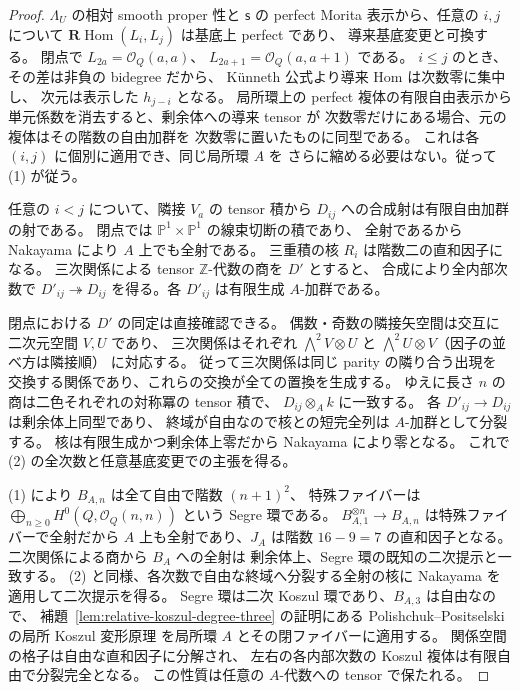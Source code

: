 \begin{proof}
$\Lambda_U$ の相対 smooth proper 性と $\mathsf s$ の perfect
Morita 表示から、任意の $i,j$ について
$\mathbf R\operatorname{Hom}(L_i,L_j)$ は基底上 perfect であり、
導来基底変更と可換する。
閉点で $L_{2a}=\mathcal O_Q(a,a)$、
$L_{2a+1}=\mathcal O_Q(a,a+1)$ である。
$i\le j$ のとき、その差は非負の bidegree だから、
K\"unneth 公式より導来 Hom は次数零に集中し、
次元は表示した $h_{j-i}$ となる。
局所環上の perfect 複体の有限自由表示から
単元係数を消去すると、剰余体への導来 tensor が
次数零だけにある場合、元の複体はその階数の自由加群を
次数零に置いたものに同型である。
これは各 $(i,j)$ に個別に適用でき、同じ局所環 $A$ を
さらに縮める必要はない。従って (1) が従う。

任意の $i<j$ について、隣接 $V_a$ の tensor 積から
$D_{ij}$ への合成射は有限自由加群の射である。
閉点では $\mathbb P^1\times\mathbb P^1$ の線束切断の積であり、
全射であるから Nakayama により $A$ 上でも全射である。
三重積の核 $R_i$ は階数二の直和因子になる。
三次関係による tensor $\mathbb Z$-代数の商を $D'$ とすると、
合成により全内部次数で $D'_{ij}\twoheadrightarrow D_{ij}$
を得る。各 $D'_{ij}$ は有限生成 $A$-加群である。

閉点における $D'$ の同定は直接確認できる。
偶数・奇数の隣接矢空間は交互に二次元空間 $V,U$ であり、
三次関係はそれぞれ
$\bigwedge^2V\otimes U$ と
$\bigwedge^2U\otimes V$（因子の並べ方は隣接順）
に対応する。
従って三次関係は同じ parity の隣り合う出現を
交換する関係であり、これらの交換が全ての置換を生成する。
ゆえに長さ $n$ の商は二色それぞれの対称冪の tensor 積で、
$D_{ij}\otimes_Ak$ に一致する。
各 $D'_{ij}\to D_{ij}$ は剰余体上同型であり、
終域が自由なので核との短完全列は $A$-加群として分裂する。
核は有限生成かつ剰余体上零だから Nakayama により零となる。
これで (2) の全次数と任意基底変更での主張を得る。

(1) により $B_{A,n}$ は全て自由で階数 $(n+1)^2$、
特殊ファイバーは
$\bigoplus_{n\ge0}H^0(Q,\mathcal O_Q(n,n))$
という Segre 環である。
$B_{A,1}^{\otimes n}\to B_{A,n}$ は特殊ファイバーで全射だから
$A$ 上も全射であり、$J_A$ は階数 $16-9=7$ の直和因子となる。
二次関係による商から $B_A$ への全射は
剰余体上、Segre 環の既知の二次提示と一致する。
(2) と同様、各次数で自由な終域へ分裂する全射の核に
Nakayama を適用して二次提示を得る。
Segre 環は二次 Koszul 環であり、$B_{A,3}$ は自由なので、
補題~\ref{lem:relative-koszul-degree-three} の証明にある
Polishchuk--Positselski の局所 Koszul 変形原理
\cite[Chapter 6, Theorem 7.3 and Propositions 7.1--7.2]
{PolishchukPositselski2005}
を局所環 $A$ とその閉ファイバーに適用する。
関係空間の格子は自由な直和因子に分解され、
左右の各内部次数の Koszul 複体は有限自由で分裂完全となる。
この性質は任意の $A$-代数への tensor で保たれる。


\end{proof}
